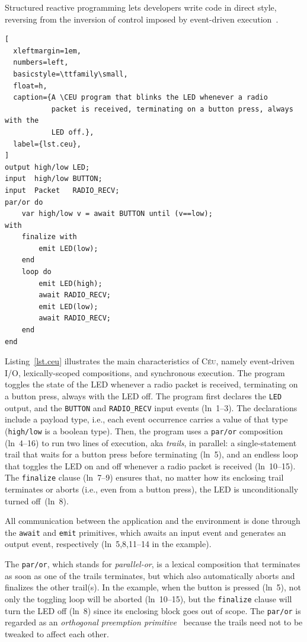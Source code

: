 \documentclass[sigplan,10pt,review,anonymous]{acmart}\settopmatter{printfolios=true,printccs=false,printacmref=false}
\newcommand{\CEU}{\textsc{C\'{e}u}\xspace}
\newcommand{\code}[1] {{\small{\texttt{#1}}}}
\begin{document}
Structured reactive programming lets developers write code in direct style,
reversing from the inversion of control imposed by event-driven
execution~\cite{rp.deprecating,rp.rescala,sync_async.cooperative}.

\begin{lstlisting}[
  xleftmargin=1em,
  numbers=left,
  basicstyle=\ttfamily\small,
  float=h,
  caption={A \CEU program that blinks the LED whenever a radio
           packet is received, terminating on a button press, always with the
           LED off.},
  label={lst.ceu},
]
output high/low LED;
input  high/low BUTTON;
input  Packet   RADIO_RECV;
par/or do
    var high/low v = await BUTTON until (v==low);
with
    finalize with
        emit LED(low);
    end
    loop do
        emit LED(high);
        await RADIO_RECV;
        emit LED(low);
        await RADIO_RECV;
    end
end
\end{lstlisting}

Listing~\ref{lst.ceu} illustrates the main characteristics of \CEU, namely
event-driven I/O, lexically-scoped compositions, and synchronous execution.
%
The program toggles the state of the LED whenever a radio packet is received,
terminating on a button press, always with the LED off.
%
The program first declares the \code{LED} output, and the \code{BUTTON} and
\code{RADIO\_RECV} input events (ln~1--3).
The declarations include a payload type, i.e., each event occurrence carries
a value of that type (\code{high/low} is a boolean type).
%
Then, the program uses a \code{par/or} composition (ln~4--16) to run two lines
of execution, aka \emph{trails}, in parallel:
a single-statement trail that waits for a button press before terminating
(ln~5), and an endless loop that toggles the LED on and off whenever a radio
packet is received (ln~10--15).
The \code{finalize} clause (ln~7--9) ensures that, no matter how its enclosing
trail terminates or aborts (i.e., even from a button press), the LED is
unconditionally turned off~(ln~8).

All communication between the application and the environment is done through
the \code{await} and \code{emit} primitives, which awaits an input event and
generates an output event, respectively (ln~5,8,11--14 in the example).

The \code{par/or}, which stands for \emph{parallel-or}, is a lexical
composition that terminates as soon as one of the trails terminates, but which
also automatically aborts and finalizes the other trail(s).
%
In the example, when the button is pressed (ln~5), not only the toggling loop
will be aborted (ln~10--15), but the \code{finalize} clause will turn the LED
off (ln~8) since its enclosing block goes out of scope.
%
The \code{par/or} is regarded as an \emph{orthogonal preemption
primitive}~\cite{esterel.preemption} because the trails need not to be tweaked
to affect each other.
\end{document}
